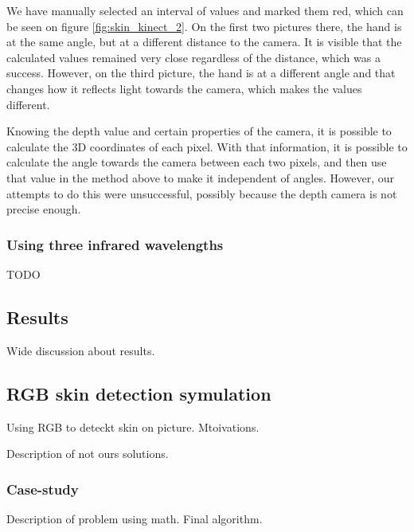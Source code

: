             We have manually selected an interval of values and marked them red, which
            can be seen on figure \ref{fig:skin_kinect_2}.
            On the first two pictures there, the hand is at the same angle, but at a
            different distance to the camera.
            It is visible that the calculated values remained very close regardless
            of the distance, which was a success.
            However, on the third picture, the hand is at a different angle and
            that changes how it reflects light towards the camera, which makes the values
            different.

            Knowing the depth value and certain properties of the camera, it is possible
            to calculate the 3D coordinates of each pixel.
            With that information, it is possible to calculate the angle towards the
            camera between each two pixels, and then use that value in the method above
            to make it independent of angles.
            However, our attempts to do this were unsuccessful, possibly because the
            depth camera is not precise enough.

        \subsubsection{Using three infrared wavelengths}

        TODO

    \subsection{Results}
        Wide discussion about results.

    \subsection{RGB skin detection symulation}
        Using RGB to deteckt skin on picture.
        Mtoivations.

        Description of not ours solutions.

        \subsubsection*{Case-study}
            Description of problem using math.
            Final algorithm.
